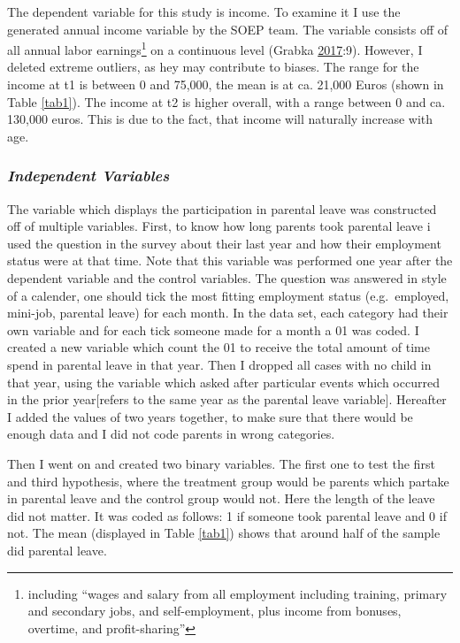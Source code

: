 \documentclass[
  11pt,
]{article}
\begin{document}
The dependent variable for this study is income. To examine it I use the generated annual income variable by the SOEP team. The variable consists off of all annual labor earnings\footnote{including ``wages and salary from all employment including training, primary and secondary jobs, and self-employment, plus income from bonuses, overtime, and profit-sharing''} on a continuous level (Grabka \protect\hyperlink{ref-grabka_soep_2017}{2017}:9). However, I deleted extreme outliers, as hey may contribute to biases. The range for the income at t1 is between 0 and 75,000, the mean is at ca. 21,000 Euros (shown in Table \ref{tab1}). The income at t2 is higher overall, with a range between 0 and ca. 130,000 euros. This is due to the fact, that income will naturally increase with age.

\hypertarget{independent-variables}{%
\subsubsection*{\texorpdfstring{\emph{Independent Variables}}{Independent Variables}}\label{independent-variables}}

The variable which displays the participation in parental leave was constructed off of multiple variables. First, to know how long parents took parental leave i used the question in the survey about their last year and how their employment status were at that time. Note that this variable was performed one year after the dependent variable and the control variables. The question was answered in style of a calender, one should tick the most fitting employment status (e.g.~employed, mini-job, parental leave) for each month. In the data set, each category had their own variable and for each tick someone made for a month a 01 was coded. I created a new variable which count the 01 to receive the total amount of time spend in parental leave in that year. Then I dropped all cases with no child in that year, using the variable which asked after particular events which occurred in the prior year{[}refers to the same year as the parental leave variable{]}. Hereafter I added the values of two years together, to make sure that there would be enough data and I did not code parents in wrong categories.

Then I went on and created two binary variables. The first one to test the first and third hypothesis, where the treatment group would be parents which partake in parental leave and the control group would not. Here the length of the leave did not matter. It was coded as follows: 1 if someone took parental leave and 0 if not. The mean (displayed in Table \ref{tab1}) shows that around half of the sample did parental leave.
\end{document}
